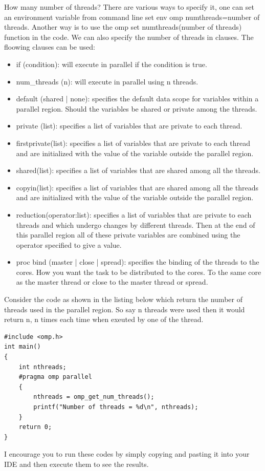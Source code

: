 \documentclass[12pt]{article}
\begin{document}
How many number of threads? There are various ways to specify it, one can set an environment variable from command line set env omp numthreads=number of threads. 
Another way is to use the omp set numthreads(number of threads) function in the code. We can also specify the number of threads in clauses.
The floowing clauses can be used:
\begin{itemize}
\item if (condition): will execute in parallel if the condition is true.
\item num\_threads (n): will execute in parallel using n threads.
\item default (shared | none): specifies the default data scope for variables within a parallel region. Should the variables be shared or private among the threads.
\item private (list): specifies a list of variables that are private to each thread.
\item firstprivate(list): specifies a list of variables that are private to each thread and are initialized with the value of the variable outside the parallel region.
\item shared(list): specifies a list of variables that are shared among all the threads.
\item copyin(list): specifies a list of variables that are shared among all the threads and are initialized with the value of the variable outside the parallel region.
\item reduction(operator:list): specifies a list of variables that are private to each threads and which undergo changes by different threads. Then at the end of this parallel region all of these private variables are combined using the operator 
specified to give a value.
\item proc bind (master | close | spread): specifies the binding of the threads to the cores. How you want the task to be distributed to the cores. To the same core as the master thread or close to the master thread or spread.
\end{itemize}
Consider the code as shown  in the listing below which return the number of threads used in the parallel region. So say n threads were used then it would return n, n times each time when exeuted by one of the thread. 
\begin{lstlisting}
#include <omp.h>
int main()
{
    int nthreads;
    #pragma omp parallel
    {
        nthreads = omp_get_num_threads();
        printf("Number of threads = %d\n", nthreads);
    }
    return 0;
}
\end{lstlisting}
I encourage you to run these codes by simply copying and pasting it into your IDE and then execute them to see the results.
\end{document}

